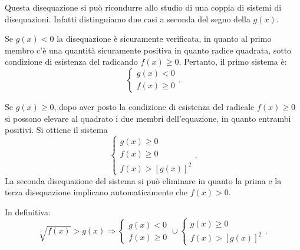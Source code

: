 Questa disequazione si può ricondurre allo studio di una coppia di sistemi di disequazioni. Infatti distinguiamo due casi a seconda del segno della $g(x)$.

\begin{itemize*}
\item Se $ g(x)<0 $ la disequazione è sicuramente verificata, in quanto al primo membro c'è una quantità sicuramente positiva in quanto radice quadrata, sotto condizione di esistenza del radicando $f(x)\ge 0$. Pertanto, il primo sistema è: 
\[\left\{\begin{array}{l}{g(x)<0}\\{f(x)\ge 0}\end{array}\right..\]
\item Se $g(x)\ge 0$, dopo aver posto la condizione di esistenza del radicale $f(x)\ge 0$ si possono elevare al quadrato i due membri dell'equazione, in quanto entrambi positivi. Si ottiene il sistema 
\[\left\{\begin{array}{l}g(x)\ge 0\\f(x)\ge 0 \\f(x)>\left[g(x)\right]^2 \end{array}\right..\] 
La seconda disequazione del sistema si può eliminare in quanto la prima e la terza disequazione implicano automaticamente che $f(x)>0$.

In definitiva:
\[\sqrt{f(x)}>g(x) \Rightarrow \left\{\begin{array}{l}{g(x)<0}\\{f(x)\ge 0}\end{array}\right.\cup \left\{\begin{array}{l}g(x)\ge 0\\f(x)>\left[g(x)\right]^2\end{array}\right..\]

\end{itemize*}

